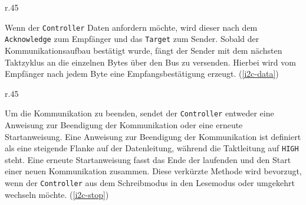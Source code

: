 \begin{wrapfigure}{r}{.45\textwidth}
	\centering
	\scalebox{1.25}{}
	\caption{Datenübertragung}
	\label{i2c-data}
\end{wrapfigure}
Wenn der \texttt{Controller} Daten anfordern möchte, wird dieser nach dem \texttt{Acknowledge} zum Empfänger und das \texttt{Target} zum Sender.
Sobald der Kommunikationsaufbau bestätigt wurde, fängt der Sender mit dem nächsten Taktzyklus an die einzelnen Bytes über den Bus zu versenden.
Hierbei wird vom Empfänger nach jedem Byte eine Empfangsbestätigung erzeugt.
(\ref{i2c-data})
\cite[9\psq]{I2C-spec_userManual}

\begin{wrapfigure}[4]{r}{.45\textwidth}
	\centering
	\scalebox{1.25}{}
	\scalebox{1.25}{}
	\caption{Kommunikationsende}
	\label{i2c-stop}
\end{wrapfigure}
Um die Kommunikation zu beenden, sendet der \texttt{Controller} entweder eine Anweisung zur Beendigung der Kommunikation oder eine erneute Startanweisung.
Eine Anweisung zur Beendigung der Kommunikation ist definiert als eine steigende Flanke auf der Datenleitung, während die Taktleitung auf \texttt{HIGH} steht.
Eine erneute Startanweisung fasst das Ende der laufenden und den Start einer neuen Kommunikation zusammen.
Diese verkürzte Methode wird bevorzugt, wenn der \texttt{Controller} aus dem Schreibmodus in den Lesemodus oder umgekehrt wechseln möchte.
(\ref{i2c-stop})
\cite[9 \& 13]{I2C-spec_userManual}
